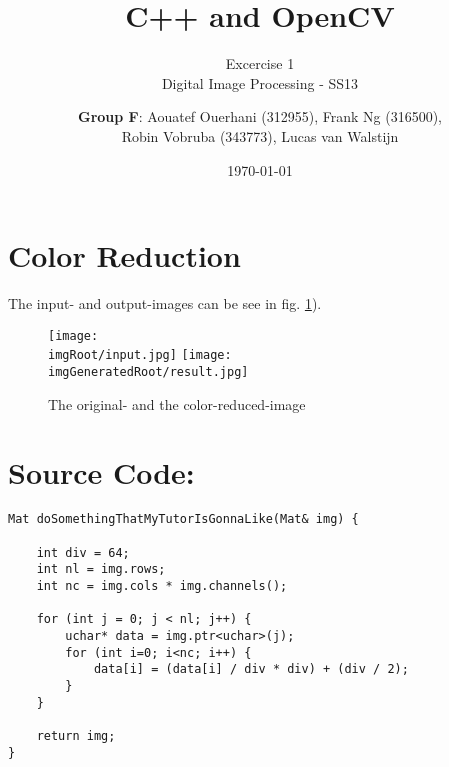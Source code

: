 \documentclass[a4paper,headings=small]{scrartcl}
\title{C++ and OpenCV}
\subtitle{Excercise 1 \\ Digital Image Processing - SS13}
\author{\textbf{Group F}: Aouatef Ouerhani (312955), Frank Ng (316500),\\ Robin Vobruba (343773), Lucas van Walstijn}
\date{\today}
\numberwithin{equation}{section} %
\numberwithin{figure}{section}   %
\newcommand{\imgRoot}{../resources/img}
\newcommand{\imgGeneratedRoot}{../../../target}
\begin{document}
\maketitle

\section{Color Reduction}

The input- and output-images can be see in
fig. \ref{fig:inOutImg}).

\begin{figure}[htbp]
	\centering
	\texttt{[image: \\imgRoot/input.jpg]}
	\texttt{[image: \\imgGeneratedRoot/result.jpg]}
	\caption{The original- and the color-reduced-image}
	\label{fig:inOutImg}
\end{figure}


\newpage
\section{Source Code:}

\begin{lstlisting}[label=interstingFunction,caption=The function with the color-reduction code.]
Mat doSomethingThatMyTutorIsGonnaLike(Mat& img) {

	int div = 64;
	int nl = img.rows;
	int nc = img.cols * img.channels();

	for (int j = 0; j < nl; j++) {
		uchar* data = img.ptr<uchar>(j);
		for (int i=0; i<nc; i++) {
			data[i] = (data[i] / div * div) + (div / 2);
		}
	}

	return img;
}
\end{lstlisting}
\end{document}
